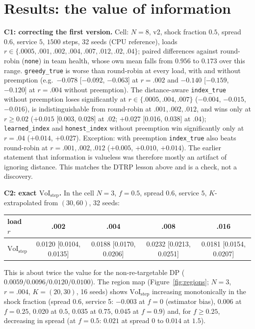 \documentclass[10pt]{article}
\begin{document}
\section{Results: the value of information}\label{sec:voi}
\textbf{C1: correcting the first version.} Cell: $N{=}8$, v2, shock fraction $0.5$, spread $0.6$, service $5$, $1500$ steps, 32 seeds (CPU reference), loads $r\in\{.0005,.001,.002,.004,.007,.012,.02,.04\}$; paired differences against round-robin (\texttt{none}) in team health, whose own mean falls from $0.956$ to $0.173$ over this range. \texttt{greedy\_true} is worse than round-robin at every load, with and without preemption (e.g.\ $-0.078$ [$-0.092$, $-0.063$] at $r{=}.002$ and $-0.140$ [$-0.159$, $-0.120$] at $r{=}.004$ without preemption). The distance-aware \texttt{index\_true} without preemption loses significantly at $r\in\{.0005,.004,.007\}$ ($-0.004$, $-0.015$, $-0.016$), is indistinguishable from round-robin at $.001,.002,.012$, and wins only at $r\ge0.02$ ($+0.015$ [0.003, 0.028] at $.02$; $+0.027$ [0.016, 0.038] at $.04$); \texttt{learned\_index} and \texttt{honest\_index} without preemption win significantly only at $r{=}.04$ ($+0.014$, $+0.027$). Exception: with preemption \texttt{index\_true} also beats round-robin at $r{=}.001,.002,.012$ ($+0.005$, $+0.010$, $+0.014$). The earlier statement that information is valueless was therefore mostly an artifact of ignoring distance. This matches the DTRP lesson above and is a check, not a discovery.

\textbf{C2: exact $\mathrm{VoI}_{\text{step}}$.} In the cell $N{=}3$, $f{=}0.5$, spread $0.6$, service $5$, $K$-extrapolated from $(30,60)$, 32 seeds:
\begin{center}\small
\begin{tabular}{lcccc}\toprule
load $r$ & .002 & .004 & .008 & .016\\\midrule
$\mathrm{VoI}_{\text{step}}$ & 0.0120 [0.0104, 0.0135] & 0.0188 [0.0170, 0.0206] & 0.0232 [0.0213, 0.0251] & 0.0181 [0.0154, 0.0207]\\\bottomrule
\end{tabular}
\end{center}
This is about twice the value for the non-re-targetable DP ($0.0059/0.0096/0.0120/0.0100$). The region map (Figure~\ref{fig:regions}; $N{=}3$, $r{=}.004$, $K{=}(20,30)$, 16 seeds) shows $\mathrm{VoI}_{\text{step}}$ increasing monotonically in the shock fraction (spread $0.6$, service 5: $-0.003$ at $f{=}0$ (estimator bias), 0.006 at $f{=}0.25$, 0.020 at $0.5$, 0.035 at $0.75$, 0.045 at $f{=}0.9$) and, for $f\ge0.25$, decreasing in spread (at $f{=}0.5$: $0.021$ at spread $0$ to $0.014$ at $1.5$).
\end{document}
